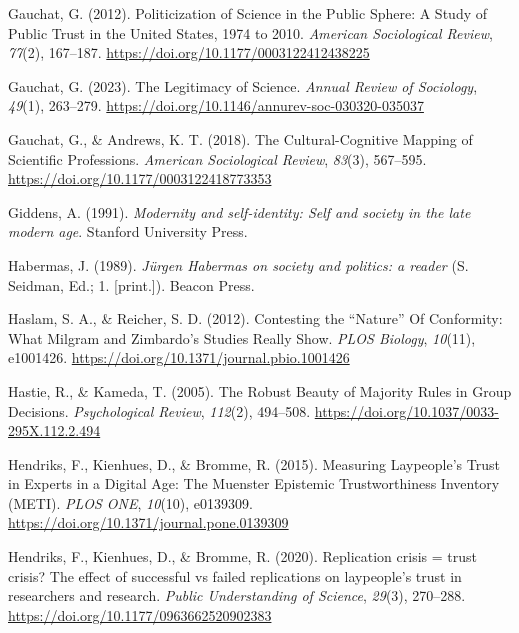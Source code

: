 \documentclass[
  jou,
  floatsintext,
  longtable,
  nolmodern,
  notxfonts,
  notimes,
  colorlinks=true,linkcolor=blue,citecolor=blue,urlcolor=blue]{apa7}
\newlength{\cslhangindent}
\newenvironment{CSLReferences}[2] %
 {\begin{list}{}{%
  \setlength{\itemindent}{0pt}
  \setlength{\leftmargin}{0pt}
  \setlength{\parsep}{0pt}
  \ifodd #1
   \setlength{\leftmargin}{\cslhangindent}
   \setlength{\itemindent}{-1\cslhangindent}
  \fi
  \setlength{\itemsep}{#2\baselineskip}}}
 {\end{list}}
\begin{document}
\begin{CSLReferences}{1}{0}
Gauchat, G. (2012). Politicization of Science in the Public Sphere: A
Study of Public Trust in the United States, 1974 to 2010. \emph{American
Sociological Review}, \emph{77}(2), 167--187.
\url{https://doi.org/10.1177/0003122412438225}

Gauchat, G. (2023). The Legitimacy of Science. \emph{Annual Review of
Sociology}, \emph{49}(1), 263--279.
\url{https://doi.org/10.1146/annurev-soc-030320-035037}

Gauchat, G., \& Andrews, K. T. (2018). The Cultural-Cognitive Mapping of
Scientific Professions. \emph{American Sociological Review},
\emph{83}(3), 567--595. \url{https://doi.org/10.1177/0003122418773353}

Giddens, A. (1991). \emph{Modernity and self-identity: Self and society
in the late modern age}. Stanford University Press.

Habermas, J. (1989). \emph{Jürgen Habermas on society and politics: a
reader} (S. Seidman, Ed.; 1. {[}print.{]}). Beacon Press.

Haslam, S. A., \& Reicher, S. D. (2012). Contesting the {``}Nature{''}
Of Conformity: What Milgram and Zimbardo's Studies Really Show.
\emph{PLOS Biology}, \emph{10}(11), e1001426.
\url{https://doi.org/10.1371/journal.pbio.1001426}

Hastie, R., \& Kameda, T. (2005). The Robust Beauty of Majority Rules in
Group Decisions. \emph{Psychological Review}, \emph{112}(2), 494--508.
\url{https://doi.org/10.1037/0033-295X.112.2.494}

Hendriks, F., Kienhues, D., \& Bromme, R. (2015). Measuring
Laypeople{'}s Trust in Experts in a Digital Age: The Muenster Epistemic
Trustworthiness Inventory (METI). \emph{PLOS ONE}, \emph{10}(10),
e0139309. \url{https://doi.org/10.1371/journal.pone.0139309}

Hendriks, F., Kienhues, D., \& Bromme, R. (2020). Replication crisis =
trust crisis? The effect of successful vs failed replications on
laypeople{'}s trust in researchers and research. \emph{Public
Understanding of Science}, \emph{29}(3), 270--288.
\url{https://doi.org/10.1177/0963662520902383}


\end{CSLReferences}
\end{document}
